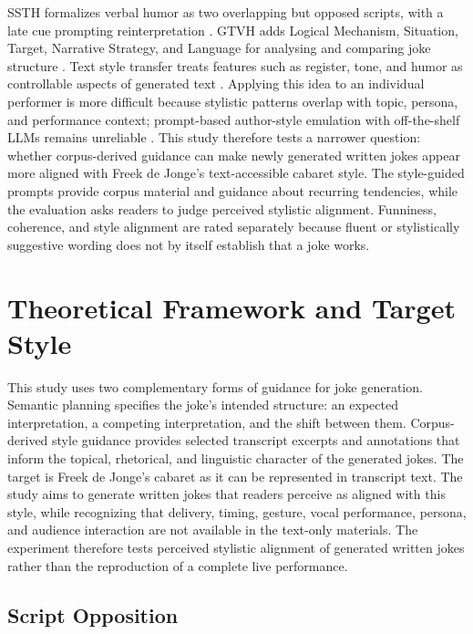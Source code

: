 \documentclass[11pt]{article}
\begin{document}
SSTH formalizes verbal humor as two overlapping but opposed scripts, with a late cue prompting reinterpretation \citep{raskin1985}. GTVH adds Logical Mechanism, Situation, Target, Narrative Strategy, and Language for analysing and comparing joke structure \citep{attardo1991}. Text style transfer treats features such as register, tone, and humor as controllable aspects of generated text \citep{jin2022style}. Applying this idea to an individual performer is more difficult because stylistic patterns overlap with topic, persona, and performance context; prompt-based author-style emulation with off-the-shelf LLMs remains unreliable \citep{bhandarkar2024emulating}. This study therefore tests a narrower question: whether corpus-derived guidance can make newly generated written jokes appear more aligned with Freek de Jonge's text-accessible cabaret style. The style-guided prompts provide corpus material and guidance about recurring tendencies, while the evaluation asks readers to judge perceived stylistic alignment. Funniness, coherence, and style alignment are rated separately because fluent or stylistically suggestive wording does not by itself establish that a joke works.

\section{Theoretical Framework and Target Style}\label{theoretical-framework-and-target-style}

This study uses two complementary forms of guidance for joke generation. Semantic planning specifies the joke's intended structure: an expected interpretation, a competing interpretation, and the shift between them. Corpus-derived style guidance provides selected transcript excerpts and annotations that inform the topical, rhetorical, and linguistic character of the generated jokes. The target is Freek de Jonge's cabaret as it can be represented in transcript text. The study aims to generate written jokes that readers perceive as aligned with this style, while recognizing that delivery, timing, gesture, vocal performance, persona, and audience interaction are not available in the text-only materials. The experiment therefore tests perceived stylistic alignment of generated written jokes rather than the reproduction of a complete live performance.

\subsection{Script Opposition}\label{script-opposition}
\end{document}

